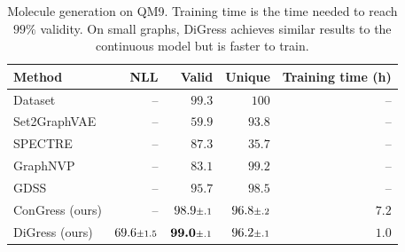 \documentclass{article} %
\theoremstyle{plain}
\theoremstyle{definition}
\theoremstyle{remark}
\begin{document}
\begin{table}[t]
    \centering
        \caption{Molecule generation on QM9. Training time is the time needed to reach $99\%$ validity. On small graphs, DiGress achieves similar results to the continuous model but is faster to train.\vspace{-0.1cm}}
    \begin{tabular}{l r r r r } \toprule
    Method & NLL \hspace{0.3cm}&  Valid \hspace{0.2cm} & Unique\hspace{0.2cm}  & Training time (h) \\ \midrule 
        Dataset  & --\hspace{0.45cm}              & $99.3$\hspace{0.45cm} & $100$\hspace{0.60cm} &  --\hspace{0.60cm} \\ \midrule
    Set2GraphVAE & --\hspace{0.45cm}              & $59.9$\hspace{0.45cm} & $93.8$\hspace{0.45cm} & --\hspace{0.6cm}  \\
    SPECTRE      & --\hspace{0.45cm}             & $87.3$\hspace{0.45cm} & $35.7$\hspace{0.45cm} & --\hspace{0.60cm} \\
    GraphNVP     & --\hspace{0.45cm}          & $83.1$\hspace{0.45cm} & $99.2$\hspace{0.45cm} & --\hspace{0.60cm} \\
    GDSS         & --\hspace{0.45cm}             & $95.7$\hspace{0.45cm} & $\bm{98.5}$\hspace{0.4cm} & --\hspace{0.60cm} \vspace{0.1cm} \\
    ConGress  (ours)  & --\hspace{0.45cm}        & $98.9{\scriptstyle \pm {.1}}$       & $96.8{\scriptstyle \pm {.2}}$            & $7.2$\hspace{0.6cm} \\
    DiGress (ours)  & $69.6{\scriptstyle \pm {1.5}}$ &  $\bm{99.0} {\scriptstyle \pm {.1}}$       & $96.2{\scriptstyle \pm {.1}}$       & $\bm{1.0}$\hspace{0.6cm}  \\
    \bottomrule
    \end{tabular}\vspace{-0.3cm}
    \label{tab:qm9}
\end{table}
\end{document}

